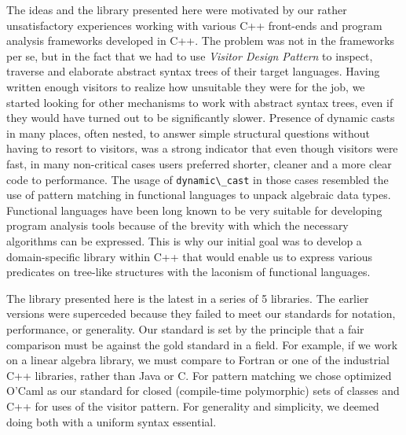 \documentclass[preprint]{sigplanconf}
\makeatletter
\DeclareRobustCommand{\code}[1]{{\lstinline[breaklines=false,escapechar=@]{#1}}}
\makeatother
\begin{document}
The ideas and the library presented here were motivated by our rather 
unsatisfactory experiences working with various C++ front-ends and program 
analysis frameworks developed in C++\cite{Pivot09,Phoenix,Clang,Lise}. The 
problem was not in the frameworks per se, but in the fact that we had to use 
\emph{Visitor Design Pattern}\cite{DesignPatterns1993} to inspect, traverse and 
elaborate abstract syntax trees of their target languages. Having written enough 
visitors to realize how unsuitable they were for the job, we started looking for 
other mechanisms to work with abstract syntax trees, even if they would have 
turned out to be significantly slower. 
Presence of dynamic casts in many places, often nested, to answer simple 
structural questions without having to resort to visitors, was a strong 
indicator that even though visitors were fast, in many non-critical cases 
users preferred shorter, cleaner and a more clear code to performance.
The usage of \code{dynamic\_cast} in those cases resembled the use of 
pattern matching in functional languages to unpack algebraic data types. 
Functional languages have been long known to be very suitable for developing 
program analysis tools because of the brevity with which the necessary 
algorithms can be expressed. This is why our initial goal was to develop a 
domain-specific library within C++ that would enable us to express various 
predicates on tree-like structures with the laconism of functional languages.

The library presented here is the latest in a series of 5 libraries.
The earlier versions were superceded because they failed to meet our standards
for notation, performance, or generality.
Our standard is set by the principle that a fair comparison must be against the gold
standard in a field. For example, if we work on a linear algebra library,
we must compare to Fortran or one of the industrial C++ libraries, rather than Java or C.
For pattern matching we chose optimized O'Caml as our standard for closed (compile-time
polymorphic) sets of classes and C++ for uses of the visitor pattern.
For generality and simplicity, we deemed doing both with a uniform syntax essential.

\end{document}
